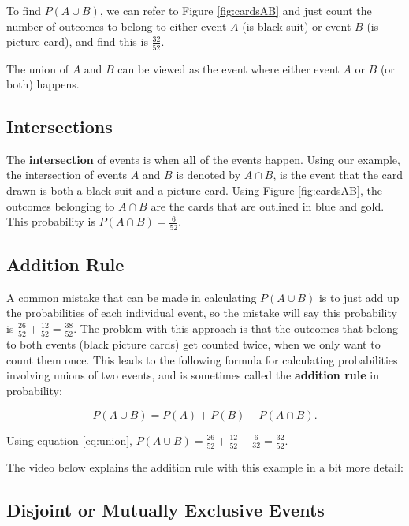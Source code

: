 \documentclass[
]{book}
\begin{document}
To find \(P(A \cup B)\), we can refer to Figure \ref{fig:cardsAB} and just count the number of outcomes to belong to either event \(A\) (is black suit) or event \(B\) (is picture card), and find this is \(\frac{32}{52}\).

The union of \(A\) and \(B\) can be viewed as the event where either event \(A\) or \(B\) (or both) happens.

\hypertarget{intersections}{%
\subsection{Intersections}\label{intersections}}

The \textbf{intersection} of events is when \textbf{all} of the events happen. Using our example, the intersection of events \(A\) and \(B\) is denoted by \(A \cap B\), is the event that the card drawn is both a black suit and a picture card. Using Figure \ref{fig:cardsAB}, the outcomes belonging to \(A \cap B\) are the cards that are outlined in blue and gold. This probability is \(P(A \cap B) = \frac{6}{52}\).

\hypertarget{addition-rule}{%
\subsection{Addition Rule}\label{addition-rule}}

A common mistake that can be made in calculating \(P(A \cup B)\) is to just add up the probabilities of each individual event, so the mistake will say this probability is \(\frac{26}{52} + \frac{12}{52} = \frac{38}{52}\). The problem with this approach is that the outcomes that belong to both events (black picture cards) get counted twice, when we only want to count them once. This leads to the following formula for calculating probabilities involving unions of two events, and is sometimes called the \textbf{addition rule} in probability:

\begin{equation} 
P(A \cup B) = P(A) + P(B) - P(A \cap B).
\label{eq:union}
\end{equation}

Using equation \eqref{eq:union}, \(P(A \cup B) = \frac{26}{52} + \frac{12}{52} - \frac{6}{32} = \frac{32}{52}\).

The video below explains the addition rule with this example in a bit more detail:

\hypertarget{disjoint-or-mutually-exclusive-events}{%
\subsection{Disjoint or Mutually Exclusive Events}\label{disjoint-or-mutually-exclusive-events}}
\end{document}
